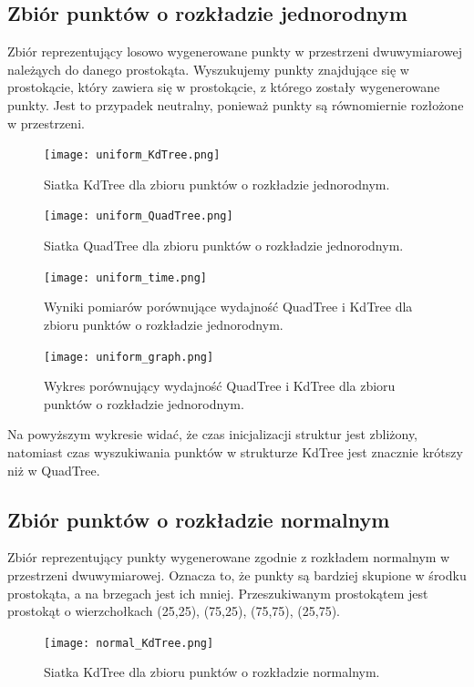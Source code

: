 \documentclass{lab}
\begin{document}
\subsection{Zbiór punktów o rozkładzie jednorodnym}
Zbiór reprezentujący losowo wygenerowane punkty w przestrzeni dwuwymiarowej należąych do danego prostokąta.
Wyszukujemy punkty znajdujące się w prostokącie, który zawiera się w prostokącie, z którego zostały wygenerowane punkty.
Jest to przypadek neutralny, ponieważ punkty są równomiernie rozłożone w przestrzeni.
\begin{figure}[H]
  \centering
  \texttt{[image: uniform\_KdTree.png]}
  \caption{Siatka KdTree dla zbioru punktów o rozkładzie jednorodnym.}
  \label{fig:uniform_KdTree}
\end{figure}

\begin{figure}[H]
  \centering
  \texttt{[image: uniform\_QuadTree.png]}
  \caption{Siatka QuadTree dla zbioru punktów o rozkładzie jednorodnym.}
  \label{fig:uniform_QuadTree}
\end{figure}

\begin{figure}[H]
  \centering
  \texttt{[image: uniform\_time.png]}
  \caption{Wyniki pomiarów porównujące wydajność QuadTree i KdTree dla zbioru punktów o rozkładzie jednorodnym.}
  \label{fig:uniform_time}
\end{figure}

\begin{figure}[H]
  \centering
  \texttt{[image: uniform\_graph.png]}
  \caption{Wykres porównujący wydajność QuadTree i KdTree dla zbioru punktów o rozkładzie jednorodnym.}
  \label{fig:uniform_graph}
\end{figure}

Na powyższym wykresie widać, że czas inicjalizacji struktur jest zbliżony, natomiast czas wyszukiwania punktów w strukturze KdTree jest znacznie krótszy niż w QuadTree.

\subsection{Zbiór punktów o rozkładzie normalnym}
Zbiór reprezentujący punkty wygenerowane zgodnie z rozkładem normalnym w przestrzeni dwuwymiarowej.
Oznacza to, że punkty są bardziej skupione w środku prostokąta, a na brzegach jest ich mniej.
Przeszukiwanym prostokątem jest prostokąt o wierzchołkach (25,25), (75,25), (75,75), (25,75).

\begin{figure}[H]
  \centering
  \texttt{[image: normal\_KdTree.png]}
  \caption{Siatka KdTree dla zbioru punktów o rozkładzie normalnym.}
  \label{fig:normal_KdTree}
\end{figure}
\end{document}
